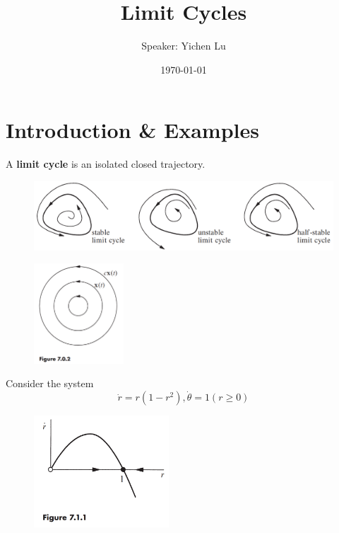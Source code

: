 \documentclass[9pt,aspectratio=43,mathserif,table]{beamer}
\title{Limit Cycles}
\author{Speaker: Yichen Lu\quad \newline  \newline \quad }
\institute{\fontsize{8pt}{14pt}}
\date{\today}
\begin{document}

\frame{\titlepage}


\section{Introduction \& Examples}

\begin{frame}
	A \textbf{limit cycle} is an isolated closed trajectory.

	\begin{figure}[H]
		\centering
		\includegraphics[width=\textwidth]{fig701.jpg}
	\end{figure}

	\begin{figure}
		\centering
		\includegraphics[width=0.3\textwidth]{fig702.jpg}
	\end{figure}
\end{frame}


\begin{frame}
	Consider the system
	$$
	\dot{r}=r\left( 1-r^2 \right) ,  \dot{\theta}=1  \left( r\ge 0 \right) 
	$$
	\begin{figure}
		\centering
		\includegraphics[width=0.45\textwidth]{fig711.jpg}
	\end{figure}

\end{frame}
\end{document}
